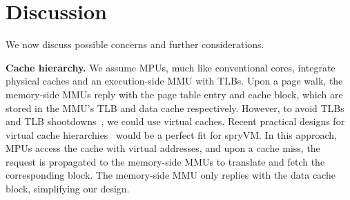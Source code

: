\section{Discussion}
\label{sec:discussion}


We now discuss possible concerns and further considerations.




\noindent\textbf{Cache hierarchy.} We assume MPUs, much like conventional cores, integrate physical caches and an execution-side MMU with TLBs. Upon a page walk, the memory-side MMUs reply with the page table entry and cache block, which are stored in the MMU's TLB and data cache respectively. However, to avoid TLBs and TLB shootdowns~\cite{villavieja:didi}, we could use virtual caches. Recent practical designs for virtual cache hierarchies~\cite{yoon:revisiting, park:efficient} would be a perfect fit for spryVM. In this approach, MPUs access the cache with virtual addresses, and upon a cache miss, the request is propagated to the memory-side MMUs to translate and fetch the corresponding block. The memory-side MMU only replies with the data cache block, simplifying our design.     

